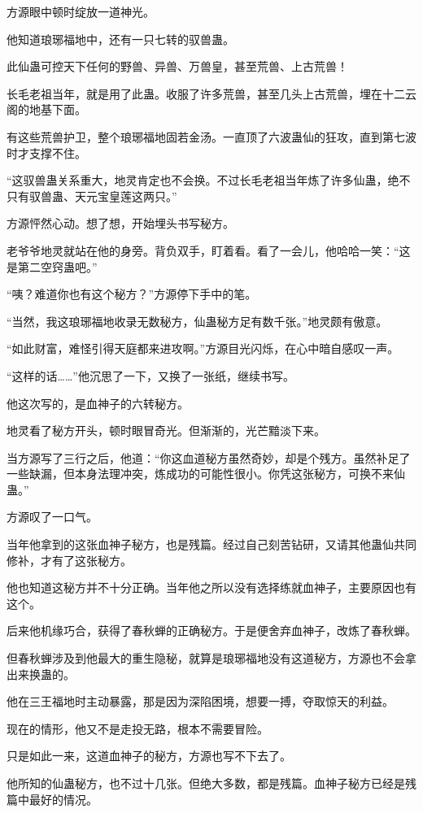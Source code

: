 \begin{this_body}
方源眼中顿时绽放一道神光。

他知道琅琊福地中，还有一只七转的驭兽蛊。

此仙蛊可控天下任何的野兽、异兽、万兽皇，甚至荒兽、上古荒兽！

长毛老祖当年，就是用了此蛊。收服了许多荒兽，甚至几头上古荒兽，埋在十二云阁的地基下面。

有这些荒兽护卫，整个琅琊福地固若金汤。一直顶了六波蛊仙的狂攻，直到第七波时才支撑不住。

“这驭兽蛊关系重大，地灵肯定也不会换。不过长毛老祖当年炼了许多仙蛊，绝不只有驭兽蛊、天元宝皇莲这两只。”

方源怦然心动。想了想，开始埋头书写秘方。

老爷爷地灵就站在他的身旁。背负双手，盯着看。看了一会儿，他哈哈一笑：“这是第二空窍蛊吧。”

“咦？难道你也有这个秘方？”方源停下手中的笔。

“当然，我这琅琊福地收录无数秘方，仙蛊秘方足有数千张。”地灵颇有傲意。

“如此财富，难怪引得天庭都来进攻啊。”方源目光闪烁，在心中暗自感叹一声。

“这样的话……”他沉思了一下，又换了一张纸，继续书写。

他这次写的，是血神子的六转秘方。

地灵看了秘方开头，顿时眼冒奇光。但渐渐的，光芒黯淡下来。

当方源写了三行之后，他道：“你这血道秘方虽然奇妙，却是个残方。虽然补足了一些缺漏，但本身法理冲突，炼成功的可能性很小。你凭这张秘方，可换不来仙蛊。”

方源叹了一口气。

当年他拿到的这张血神子秘方，也是残篇。经过自己刻苦钻研，又请其他蛊仙共同修补，才有了这张秘方。

他也知道这秘方并不十分正确。当年他之所以没有选择练就血神子，主要原因也有这个。

后来他机缘巧合，获得了春秋蝉的正确秘方。于是便舍弃血神子，改炼了春秋蝉。

但春秋蝉涉及到他最大的重生隐秘，就算是琅琊福地没有这道秘方，方源也不会拿出来换蛊的。

他在三王福地时主动暴露，那是因为深陷困境，想要一搏，夺取惊天的利益。

现在的情形，他又不是走投无路，根本不需要冒险。

只是如此一来，这道血神子的秘方，方源也写不下去了。

他所知的仙蛊秘方，也不过十几张。但绝大多数，都是残篇。血神子秘方已经是残篇中最好的情况。


\end{this_body}
